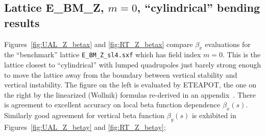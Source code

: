 \documentclass[]{article}
\begin{document}
\subsection{Lattice E\_BM\_Z, $m=0$, ``cylindrical'' bending results}
Figures~\ref{fig:UAL_Z_betax} and \ref{fig:RT_Z_betax}
compare $\beta_x$ evaluations
for the ``benchmark'' lattice {\tt E\_BM\_Z\_sl4.sxf}
which has field index $m=0$.
This is the lattice closest to ``cylindrical'' with
lumped quadrupoles just barely strong enough to move
the lattice away from the boundary between vertical
stability and vertical instability.
The figure on the left is evaluated by ETEAPOT, 
the one on the right by the linearized (Wollnik) 
formulas re-derived in an appendix~\cite{pEDM}.
There is agreement to excellent accuracy on local 
beta function dependence $\beta_x(s)$. Similarly good
agreement for vertical beta function $\beta_y(s)$ is exhibited 
in Figures~\ref{fig:UAL_Z_betay} and \ref{fig:RT_Z_betay};
%
\end{document}
